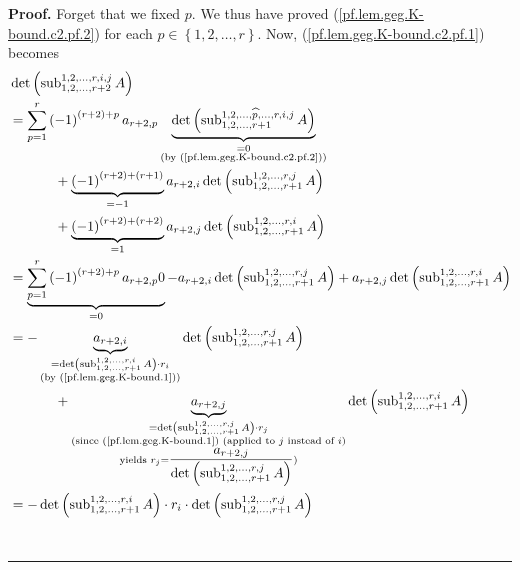 \documentclass[numbers=enddot,12pt,final,onecolumn,notitlepage]{scrartcl}%
\theoremstyle{definition}
\newenvironment{proof}[1][Proof]{\noindent\textbf{#1.} }{\ \rule{0.5em}{0.5em}}
\let\sumnonlimits\sum
\renewcommand{\sum}{\sumnonlimits\limits}
\theoremstyle{plainsl}
\begin{document}
\begin{proof}
Forget that we fixed $p$. We thus have proved
(\ref{pf.lem.geg.K-bound.c2.pf.2}) for each $p\in\left\{  1,2,\ldots
,r\right\}  $. Now, (\ref{pf.lem.geg.K-bound.c2.pf.1}) becomes%
\begin{align*}
&  \det\left(  \operatorname*{sub}\nolimits_{1,2,\ldots,r+2}^{1,2,\ldots
,r,i,j}A\right) \\
&  =\sum_{p=1}^{r}\left(  -1\right)  ^{\left(  r+2\right)  +p}a_{r+2,p}%
\underbrace{\det\left(  \operatorname*{sub}\nolimits_{1,2,\ldots
,r+1}^{1,2,\ldots,\widehat{p},\ldots,r,i,j}A\right)  }%
_{\substack{=0\\\text{(by (\ref{pf.lem.geg.K-bound.c2.pf.2}))}}}\\
&  \ \ \ \ \ \ \ \ \ \ +\underbrace{\left(  -1\right)  ^{\left(  r+2\right)
+\left(  r+1\right)  }}_{=-1}a_{r+2,i}\det\left(  \operatorname*{sub}%
\nolimits_{1,2,\ldots,r+1}^{1,2,\ldots,r,j}A\right) \\
&  \ \ \ \ \ \ \ \ \ \ +\underbrace{\left(  -1\right)  ^{\left(  r+2\right)
+\left(  r+2\right)  }}_{=1}a_{r+2,j}\det\left(  \operatorname*{sub}%
\nolimits_{1,2,\ldots,r+1}^{1,2,\ldots,r,i}A\right) \\
&  =\underbrace{\sum_{p=1}^{r}\left(  -1\right)  ^{\left(  r+2\right)
+p}a_{r+2,p}0}_{=0}-a_{r+2,i}\det\left(  \operatorname*{sub}%
\nolimits_{1,2,\ldots,r+1}^{1,2,\ldots,r,j}A\right)  +a_{r+2,j}\det\left(
\operatorname*{sub}\nolimits_{1,2,\ldots,r+1}^{1,2,\ldots,r,i}A\right) \\
&  =-\underbrace{a_{r+2,i}}_{\substack{=\det\left(  \operatorname*{sub}%
\nolimits_{1,2,\ldots,r+1}^{1,2,\ldots,r,i}A\right)  \cdot r_{i}\\\text{(by
(\ref{pf.lem.geg.K-bound.1}))}}}\det\left(  \operatorname*{sub}%
\nolimits_{1,2,\ldots,r+1}^{1,2,\ldots,r,j}A\right) \\
&  \ \ \ \ \ \ \ \ \ \ +\underbrace{a_{r+2,j}}_{\substack{=\det\left(
\operatorname*{sub}\nolimits_{1,2,\ldots,r+1}^{1,2,\ldots,r,j}A\right)  \cdot
r_{j}\\\text{(since (\ref{pf.lem.geg.K-bound.1}) (applied to }j\text{ instead
of }i\text{)}\\\text{yields }r_{j}=\dfrac{a_{r+2,j}}{\det\left(
\operatorname*{sub}\nolimits_{1,2,\ldots,r+1}^{1,2,\ldots,r,j}A\right)
}\text{)}}}\det\left(  \operatorname*{sub}\nolimits_{1,2,\ldots,r+1}%
^{1,2,\ldots,r,i}A\right) \\
&  =-\det\left(  \operatorname*{sub}\nolimits_{1,2,\ldots,r+1}^{1,2,\ldots
,r,i}A\right)  \cdot r_{i}\cdot\det\left(  \operatorname*{sub}%
\nolimits_{1,2,\ldots,r+1}^{1,2,\ldots,r,j}A\right) \\

\end{align*}
\end{proof}
\end{document}
